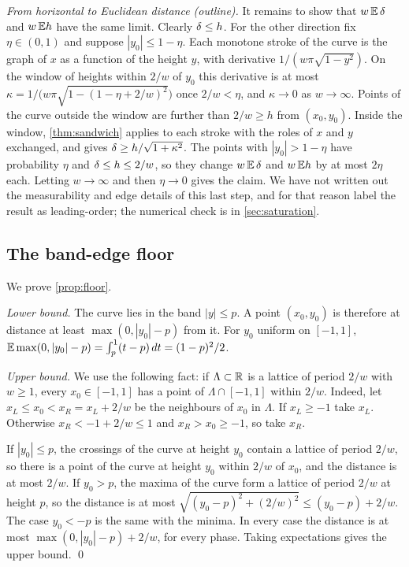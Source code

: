 \emph{From horizontal to Euclidean distance (outline).} It remains to show that
$w\,\mathbb{E}\,\delta$ and $w\,\mathbb{E} h$ have the same limit. Clearly $\delta\le h$. For the
other direction fix $\eta\in(0,1)$ and suppose $|y_0|\le1-\eta$. Each monotone
stroke of the curve is the graph of $x$ as a function of the height $y$, with
derivative $1/(w\pi\sqrt{1-y^2})$. On the window of heights within $2/w$ of
$y_0$ this derivative is at most
$\kappa=1/\bigl(w\pi\sqrt{1-(1-\eta+2/w)^2}\bigr)$ once $2/w<\eta$, and
$\kappa\to0$ as $w\to\infty$. Points of the curve outside the window are
further than $2/w\ge h$ from $(x_0,y_0)$. Inside the window,
\cref{thm:sandwich} applies to each stroke with the roles of $x$ and $y$
exchanged, and gives $\delta\ge h/\sqrt{1+\kappa^2}$. The points with
$|y_0|>1-\eta$ have probability $\eta$ and $\delta\le h\le2/w$, so they change
$w\,\mathbb{E}\,\delta$ and $w\,\mathbb{E} h$ by at most $2\eta$ each. Letting $w\to\infty$ and
then $\eta\to0$ gives the claim. We have not written out the measurability and
edge details of this last step, and for that reason label the result as
leading-order; the numerical check is in \cref{sec:saturation}.

\subsection{The band-edge floor}

We prove \cref{prop:floor}.

\emph{Lower bound.} The curve lies in the band $|y|\le p$. A point $(x_0,y_0)$
is therefore at distance at least $\max(0,|y_0|-p)$ from it. For $y_0$ uniform
on $[-1,1]$, $\mathbb{E}\max(0,|y_0|-p)=\int_p^1(t-p)\,dt=(1-p)^2/2$.

\emph{Upper bound.} We use the following fact: if $\Lambda\subset\mathbb{R}$ is a
lattice of period $2/w$ with $w\ge1$, every $x_0\in[-1,1]$ has a point of
$\Lambda\cap[-1,1]$ within $2/w$. Indeed, let $x_L\le x_0<x_R=x_L+2/w$ be the
neighbours of $x_0$ in $\Lambda$. If $x_L\ge-1$ take $x_L$. Otherwise
$x_R<-1+2/w\le1$ and $x_R>x_0\ge-1$, so take $x_R$.

If $|y_0|\le p$, the crossings of the curve at height $y_0$ contain a lattice
of period $2/w$, so there is a point of the curve at height $y_0$ within $2/w$
of $x_0$, and the distance is at most $2/w$. If $y_0>p$, the maxima of the
curve form a lattice of period $2/w$ at height $p$, so the distance is at most
$\sqrt{(y_0-p)^2+(2/w)^2}\le(y_0-p)+2/w$. The case $y_0<-p$ is the same with
the minima. In every case the distance is at most $\max(0,|y_0|-p)+2/w$, for
every phase. Taking expectations gives the upper bound. \qed

